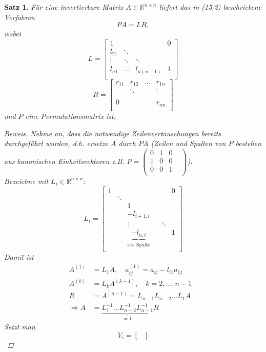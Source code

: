 \documentclass[12pt]{article}
\theoremstyle{break}
\newtheorem{theorem}{Satz}[subsection]
\begin{document}
\begin{theorem}
Für eine invertierbare Matrix $A \in \mathbb{R}^{n\times n}$ liefert das in (15.2) beschriebene Verfahren 
$$PA = LR,$$
wobei 
$$L = 
\begin{bmatrix} 
1 &&& 0 \\
l_{21} & \ddots \\
\vdots &\ddots& \ddots \\
l_{n1} &\dots& l_{n(n-1)}& 1 \\
\end{bmatrix}$$
$$R = 
\begin{bmatrix} 
r_{11} & r_{12} & \dots & r_{1n} \\
& \ddots &  & \vdots \\
\\
0&&& r_{nn} \\
\end{bmatrix}$$
und $P$ eine Permutationsmatrix ist.
\begin{proof}[Beweis]
Nehme an, dass die notwendige Zeilenvertauschungen bereits durchgeführt wurden, d.h. ersetze $A$ durch $PA$ (Zeilen und Spalten von $P$ bestehen aus kanonischen Einheitsvektoren z.B. $P = \left(\begin{smallmatrix} 0&1&0&\\1&0&0&\\0&0&1&\\ \end{smallmatrix}\right)$\Big). \\
Bezeichne mit $L_i \in \mathbb{R}^{n\times n}$:
$$L_i = 
\begin{bmatrix}
1 &&&&&0\\
& \ddots \\
&& 1 \\
&& -l_{i+1,i} &  \\
&& \vdots &&\ddots\\
&& \underbrace{-l_{n,i}}_{\text{i-te Spalte}} &&&1 \\
\end{bmatrix}$$
Damit ist
\begin{align*}
A^{(1)} &= L_1 A, \quad a_{ij}^{(1)} = a_{ij} - l_{i1} a_{1j} &\\
A^{(k)} &= L_k A^{(k-1)}, \quad k = 2,...,n-1 &\\
R &= A^{(n-1)} = L_{n-1}L_{n-2} ... L_1 A &\\
\Rightarrow A &= \underbrace{L_1^{-1}...L_{n-2}^{-1}L_{n-1}^{-1}}_{=L} R
\end{align*}
Setzt man 
$$V_i = 
\begin{bmatrix}

\end{bmatrix}$$
\end{proof}
\end{theorem}
\end{document}
